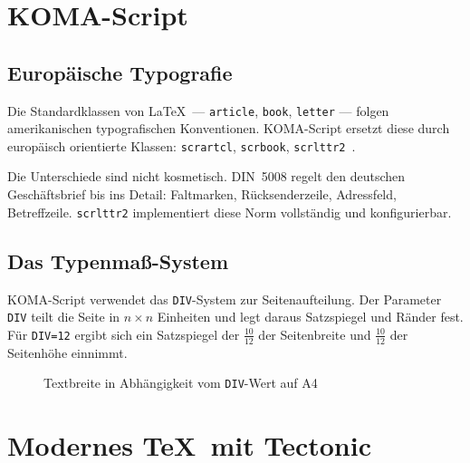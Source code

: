 \documentclass[
]{bfbook}
\begin{document}
\chapter{KOMA-Script}

\section{Europäische Typografie}

Die Standardklassen von \LaTeX\ — \texttt{article}, \texttt{book},
\texttt{letter} — folgen amerikanischen typografischen Konventionen.
KOMA-Script ersetzt diese durch europäisch orientierte Klassen:
\texttt{scrartcl}, \texttt{scrbook}, \texttt{scrlttr2}~\cite{kohm2021komascript}.

Die Unterschiede sind nicht kosmetisch. DIN~5008 regelt den deutschen
Geschäftsbrief bis ins Detail: Faltmarken, Rücksenderzeile, Adressfeld,
Betreffzeile. \texttt{scrlttr2} implementiert diese Norm vollständig
und konfigurierbar.

\section{Das Typenmaß-System}

KOMA-Script verwendet das \texttt{DIV}-System zur Seitenaufteilung.
Der Parameter \texttt{DIV} teilt die Seite in $n \times n$ Einheiten
und legt daraus Satzspiegel und Ränder fest. Für \texttt{DIV=12} ergibt
sich ein Satzspiegel der $\frac{10}{12}$ der Seitenbreite und
$\frac{10}{12}$ der Seitenhöhe einnimmt.

\begin{figure}[h]
\centering
{}
\caption{Textbreite in Abhängigkeit vom \texttt{DIV}-Wert auf A4}
\end{figure}

\chapter{Modernes \TeX\ mit Tectonic}
\end{document}

